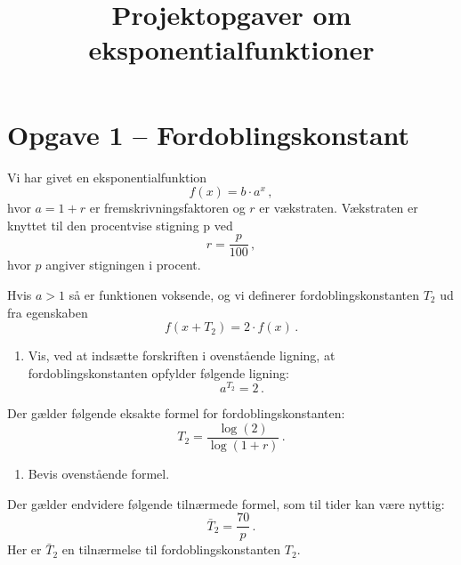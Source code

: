 \documentclass[12pt,oneside,a4paper]{article}
\title{Projektopgaver om eksponentialfunktioner}
\date{\vspace{-5ex}}
\theoremstyle{plain}
\begin{document}
\maketitle

\section*{Opgave 1 -- Fordoblingskonstant}
Vi har givet en eksponentialfunktion
\[
    f(x) = b\cdot a^x\,,
\]
hvor $a=1+r$ er fremskrivningsfaktoren og $r$ er vækstraten.
Vækstraten er knyttet til den procentvise stigning p ved
\[
    r = \frac{p}{100}\,,
\]
hvor $p$ angiver stigningen i procent.

Hvis $a>1$ så er funktionen voksende, og vi definerer fordoblingskonstanten
$T_2$ ud fra egenskaben
\[
    f(x+T_2) = 2\cdot f(x)\,.
\]

\begin{enumerate}[label=(\alph*)]
    \item Vis, ved at indsætte forskriften i ovenstående ligning, at 
fordoblingskonstanten opfylder følgende ligning:
\[
    a^{T_2} = 2\,.
\]
\end{enumerate}

Der gælder følgende eksakte formel for fordoblingskonstanten:
\[
    T_2 = \frac{\log(2)}{\log(1+r)}\,.
\]
\begin{enumerate}[label=(\alph*), resume]
    \item Bevis ovenstående formel.
\end{enumerate}

Der gælder endvidere følgende tilnærmede formel, som til tider kan være nyttig:
\[
    \bar T_2 = \frac{70}{p} \,.
\]
Her er $\bar T_2$ en tilnærmelse til fordoblingskonstanten $T_2$.
\end{document}
